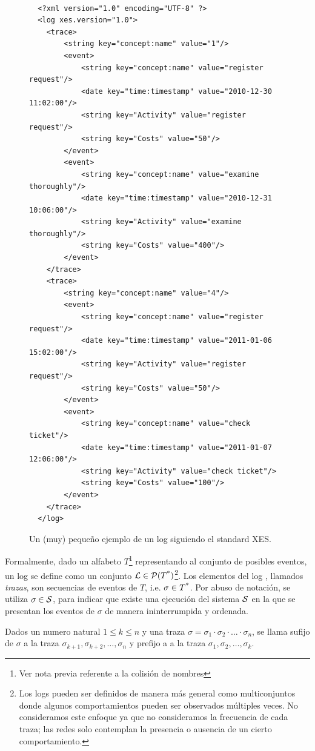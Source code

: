 \begin{figure}[t]
    \begin{verbatim}
    
  <?xml version="1.0" encoding="UTF-8" ?>
  <log xes.version="1.0">
  	<trace>
  		<string key="concept:name" value="1"/>
  		<event>
  			<string key="concept:name" value="register request"/>
  			<date key="time:timestamp" value="2010-12-30 11:02:00"/>
  			<string key="Activity" value="register request"/>
  			<string key="Costs" value="50"/>
  		</event>
  		<event>
  			<string key="concept:name" value="examine thoroughly"/>
  			<date key="time:timestamp" value="2010-12-31 10:06:00"/>
  			<string key="Activity" value="examine thoroughly"/>
  			<string key="Costs" value="400"/>
  		</event>
  	</trace>
  	<trace>
  		<string key="concept:name" value="4"/>
  		<event>
  			<string key="concept:name" value="register request"/>
  			<date key="time:timestamp" value="2011-01-06 15:02:00"/>
  			<string key="Activity" value="register request"/>
  			<string key="Costs" value="50"/>
  		</event>
  		<event>
  			<string key="concept:name" value="check ticket"/>
  			<date key="time:timestamp" value="2011-01-07 12:06:00"/>
  			<string key="Activity" value="check ticket"/>
  			<string key="Costs" value="100"/>
  		</event>
  	</trace>
  </log>
    \end{verbatim}
    \caption{Un (muy) pequeño ejemplo de un log siguiendo el standard XES.}
    \label{fig:xeslog}
\end{figure}

Formalmente, dado un alfabeto $T$\footnote{Ver nota previa referente a la colisión de nombres} representando
al conjunto de posibles eventos, un log se define como un conjunto ${\mathcal L} \in \mathcal{P}(T\textsuperscript{*})$\footnote{
Los logs pueden ser definidos de manera más general como multiconjuntos donde algunos comportamientos
pueden ser observados múltiples veces. No consideramos este enfoque ya que no consideramos 
la frecuencia de cada traza; las redes solo contemplan la presencia o ausencia de un cierto comportamiento.}. 
Los elementos del log \pmlog, llamados \textit{trazas}, son secuencias de eventos de $T$,
i.e. $\sigma \in T\textsuperscript{*}$. 
Por abuso de notación, se utiliza $\sigma \in \mathcal{S}$, para indicar que existe una ejecución del sistema $\mathcal{S}$
en la que se presentan los eventos de $\sigma$ de manera ininterrumpida y ordenada.

Dados un numero natural $1 \leq k \leq n$ y una traza $\sigma=\sigma_1\cdot\sigma_2\cdot\ldots\cdot\sigma_n$, 
se llama sufijo de $\sigma$  a la traza $\sigma_{k+1},\sigma_{k+2},\dots,\sigma_n$
y  prefijo a a la traza $\sigma_1,\sigma_2,\dots,\sigma_k$.

